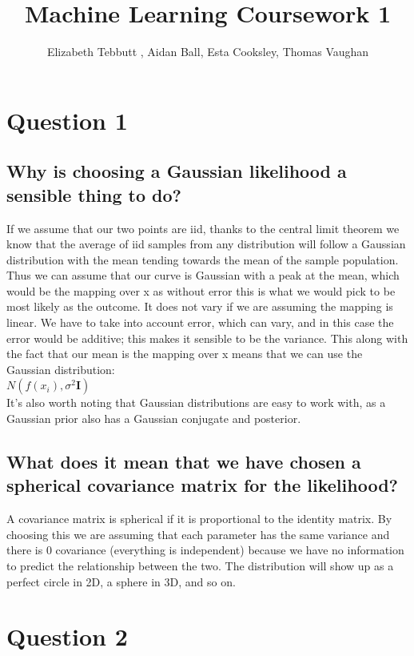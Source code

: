 \documentclass[a4paper, 9pt]{article}
\title{Machine Learning Coursework 1}
\author{Elizabeth Tebbutt , Aidan Ball, Esta Cooksley, Thomas Vaughan}
\begin{document}
\maketitle
\section*{Question 1}
\subsection*{Why is choosing a Gaussian likelihood a sensible thing to do?}
If we assume that our two points are iid, thanks to the central limit theorem we know that the average of iid samples from any distribution will follow a Gaussian distribution with the mean tending towards the mean of the sample population. Thus we can assume that our curve is Gaussian with a peak at the mean, which would be the mapping over x as without error this is what we would pick to be most likely as the outcome. It does not vary if we are assuming the mapping is linear. We have to take into account error, which can vary, and in this case the error would be additive; this makes it sensible to be the variance. This along with the fact that our mean is the mapping over x means that we can use the Gaussian distribution: \\

\( N(f(x_i), \sigma^2 \mathbf{I} ) \) \\

It's also worth noting that Gaussian distributions are easy to work with, as a Gaussian prior also has a Gaussian conjugate and posterior.
\subsection*{What does it mean that we have chosen a spherical covariance matrix for the likelihood?}
A covariance matrix is spherical if it is proportional to the identity matrix. By choosing this we are assuming that each parameter has the same variance and there is 0 covariance (everything is independent) because we have no information to predict the relationship between the two. The distribution will show up as a perfect circle in 2D, a sphere in 3D, and so on.

\section*{Question 2}
\end{document}
